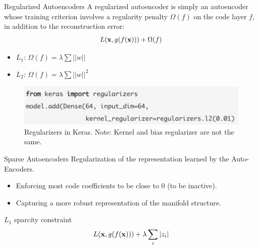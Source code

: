 \documentclass[xcolor=pdftex,dvipsnames,table,mathserif]{beamer}
\begin{document}
\begin{frame}{Regularized Autoencoders}
A regularized autoencoder is simply an autoencoder whose training criterion involves a
regularity penalty $\Omega(f)$ on the code layer $f$, in addition to the reconstruction error:
\begin{equation}
L ( \mathbf{x} , g(f(\mathbf{x})))+\Omega(f)
\end{equation}
\begin{itemize}
\item $L_1$:  $ \Omega(f) = \lambda \sum ||w||$
\item $L_2$:  $ \Omega(f) = \lambda \sum ||w||^2$
\end{itemize}
\begin{figure}
\includegraphics[width=\columnwidth]{../graphics/regularizers}
\caption{Regularizers in Keras. Note: Kernel and bias regularizer are not the same.}
\end{figure}
\end{frame}

\begin{frame}{Sparse Autoencoders}
Regularization of the representation learned by the Auto-Encoders.
\begin{itemize}
\item Enforcing most code coefficients to be close to 0 (to be inactive).
\item Capturing a more robust representation of the manifold structure.
\end{itemize}

\begin{block}{$L_1$ sparcity constraint}
  \[
  L( \mathbf{x} , g(f(\mathbf{x}))) + \lambda \sum_i |z_i|
  \]
\end{block}

\end{frame}


\end{document}
